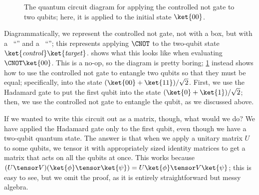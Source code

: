 \begin{figure}
  \centerline{}
  \caption{The quantum circuit diagram for applying the controlled not gate to
    two qubits; here, it is applied to the initial state $\ket{00}$.}
  \label{qcd:entangle-2-equal}
\end{figure}

Diagrammatically, we represent the controlled not gate, not with a box, but with
a ~``\QcircuitDemo[\,]{\control}'' and a
~``\QcircuitDemo{\qctarget}''; this represents applying $\CNOT$ to
the two-qubit state $\ket{\mathit{control}}\ket{\mathit{target}}$.
 shows what this looks like when evaluating $\CNOT\ket{00}$.
This is a no-op, so the diagram is pretty boring; \cref{qcd:entangle-2-equal}
instead shows how to use the controlled not gate to entangle two qubits so that
they must be equal; specifically, into the state $(\ket{00} +
\ket{11})/\sqrt{2}$.  First, we use the Hadamard gate to put the first qubit
into the state $(\ket{0} + \ket{1})/\sqrt{2}$; then, we use the controlled not
gate to entangle the qubit, as we discussed above.

If we wanted to write this circuit out as a matrix, though, what would we do?
We have applied the Hadamard gate only to the first qubit, even though we have a
two-qubit quantum state.  The answer is that when we apply a unitary matrix $U$
to some qubits, we tensor it with appropriately sized identity matrices to get a
matrix that acts on all the qubits at once.  This works because $(U \tensor
V)(\ket{\phi} \tensor \ket{\psi}) = U\ket{\phi} \tensor V\ket{\psi}$; this is
easy to see, but we omit the proof, as it is entirely straightforward but messy
algebra.

